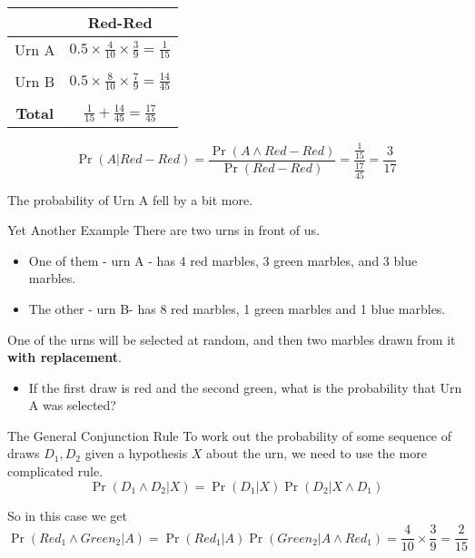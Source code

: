 \documentclass[
  ignorenonframetext,
]{beamer}
\providecommand{\tightlist}{%
  \setlength{\itemsep}{0pt}\setlength{\parskip}{0pt}}
\renewcommand{\,}{\text{, }}
\begin{document}
\begin{frame}
\begin{longtable}[]{@{}cc@{}}
\toprule
& Red-Red \\
\midrule
\endhead
Urn A & \(0.5 \times \frac{4}{10} \times \frac{3}{9} = \frac{1}{15}\) \\
& \\
Urn B &
\(0.5 \times \frac{8}{10} \times \frac{7}{9} = \frac{14}{45}\) \\
& \\
\textbf{Total} & \(\frac{1}{15} + \frac{14}{45} = \frac{17}{45}\) \\
\bottomrule
\end{longtable}

\pause

\[
\Pr(A | Red-Red) = \frac{\Pr(A \wedge Red-Red)}{\Pr(Red-Red)} = \frac{\frac{1}{15}}{\frac{17}{45}} = \frac{3}{17}
\]

\bigskip

The probability of Urn A fell by a bit more.
\end{frame}

\begin{frame}{Yet Another Example}
\protect\hypertarget{yet-another-example}{}
There are two urns in front of us.

\begin{itemize}
\tightlist
\item
  One of them - urn A - has 4 red marbles, 3 green marbles, and 3 blue
  marbles.
\item
  The other - urn B- has 8 red marbles, 1 green marbles and 1 blue
  marbles. \pause
\end{itemize}

One of the urns will be selected at random, and then two marbles drawn
from it \textbf{with replacement}.

\begin{itemize}
\tightlist
\item
  If the first draw is red and the second green, what is the probability
  that Urn A was selected?
\end{itemize}
\end{frame}

\begin{frame}{The General Conjunction Rule}
\protect\hypertarget{the-general-conjunction-rule}{}
To work out the probability of some sequence of draws \(D_1, D_2\) given
a hypothesis \(X\) about the urn, we need to use the more complicated
rule. \[
\Pr(D_1 \wedge D_2 | X) = \Pr(D_1 | X) \Pr(D_2 | X \wedge D_1)
\]

\pause

So in this case we get \[
\Pr(Red_1 \wedge Green_2 | A) = \Pr(Red_1 | A)\Pr(Green_2 | A \wedge Red_1) = \frac{4}{10} \times \frac{3}{9} = \frac{2}{15}
\]
\end{frame}
\end{document}
